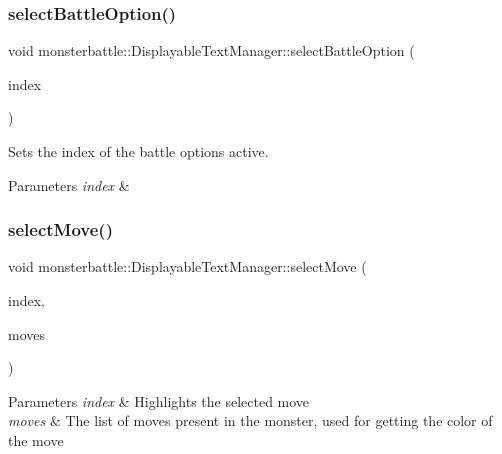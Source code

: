 \subsubsection{\texorpdfstring{select\+Battle\+Option()}{selectBattleOption()}}
{\footnotesize\ttfamily void monsterbattle\+::\+Displayable\+Text\+Manager\+::select\+Battle\+Option (\begin{DoxyParamCaption}\item[{uint8\+\_\+t}]{index }\end{DoxyParamCaption})}



Sets the index of the battle options active. 


\begin{DoxyParams}{Parameters}
{\em index} & \\
\hline
\end{DoxyParams}
\mbox{\label{classmonsterbattle_1_1DisplayableTextManager_aa041cc5a6f68b4c04456802aff12c50d}} 
\subsubsection{\texorpdfstring{select\+Move()}{selectMove()}}
{\footnotesize\ttfamily void monsterbattle\+::\+Displayable\+Text\+Manager\+::select\+Move (\begin{DoxyParamCaption}\item[{uint8\+\_\+t}]{index,  }\item[{const std\+::array$<$ const \hyperlink{classmonsterbattle_1_1monster_1_1Move}{monster\+::\+Move} $\ast$, monster\+::\+Monster\+::\+Move\+Count $>$ \&}]{moves }\end{DoxyParamCaption})}


\begin{DoxyParams}{Parameters}
{\em index} & Highlights the selected move \\
\hline
{\em moves} & The list of moves present in the monster, used for getting the color of the move \\
\hline
\end{DoxyParams}
\mbox{\label{classmonsterbattle_1_1DisplayableTextManager_af5f9f51609ca074cab189375fed1dc73}} 
